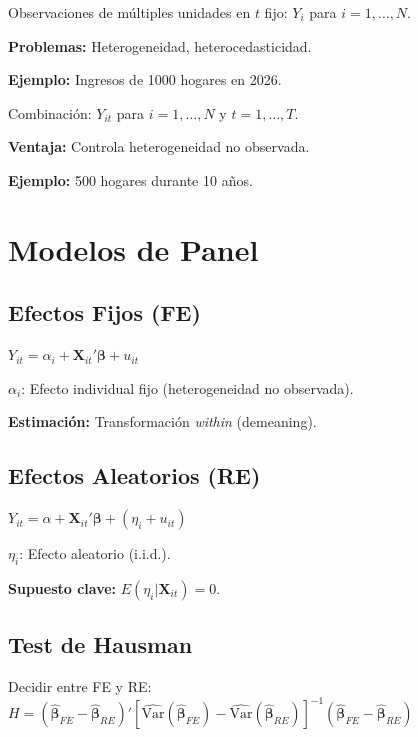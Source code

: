 \documentclass[9pt, spanish, twoside]{article}
\newcommand{\techfont}{\fontfamily{phv}\selectfont}
\newcommand{\critical}[1]{\textcolor{CriticalRed}{\textbf{#1}}}
\newcommand{\eqbox}[1]{\colorbox{TitaniumGray}{$\displaystyle #1$}}
\begin{document}
\begin{multicols*}{3}
\begin{tcolorbox}[colback=TitaniumGray, colframe=NASAClassic, arc=0pt, boxrule=0.3pt, title=\techfont \tiny CORTE TRANSVERSAL, fonttitle=\tiny\bfseries]
\scriptsize
Observaciones de múltiples unidades en $t$ fijo: $Y_i$ para $i=1,\ldots,N$.

\critical{Problemas:} Heterogeneidad, heterocedasticidad.

\textbf{Ejemplo:} Ingresos de 1000 hogares en 2026.
\end{tcolorbox}

\begin{tcolorbox}[colback=TitaniumGray, colframe=NASAClassic, arc=0pt, boxrule=0.3pt, title=\techfont \tiny DATOS DE PANEL, fonttitle=\tiny\bfseries]
\scriptsize
Combinación: $Y_{it}$ para $i=1,\ldots,N$ y $t=1,\ldots,T$.

\critical{Ventaja:} Controla heterogeneidad no observada.

\textbf{Ejemplo:} 500 hogares durante 10 años.
\end{tcolorbox}



\section{Modelos de Panel}
\subsection{Efectos Fijos (FE)}
\eqbox{Y_{it} = \alpha_i + \mathbf{X}_{it}'\boldsymbol{\beta} + u_{it}}

$\alpha_i$: Efecto individual fijo (heterogeneidad no observada).

\textbf{Estimación:} Transformación \textit{within} (demeaning).

\subsection{Efectos Aleatorios (RE)}
\eqbox{Y_{it} = \alpha + \mathbf{X}_{it}'\boldsymbol{\beta} + (\eta_i + u_{it})}

$\eta_i$: Efecto aleatorio (i.i.d.).

\textbf{Supuesto clave:} $E(\eta_i|\mathbf{X}_{it}) = 0$.

\subsection{Test de Hausman}
Decidir entre FE y RE:
$H = (\hat{\boldsymbol{\beta}}_{FE} - \hat{\boldsymbol{\beta}}_{RE})'\left[\widehat{\text{Var}}(\hat{\boldsymbol{\beta}}_{FE}) - \widehat{\text{Var}}(\hat{\boldsymbol{\beta}}_{RE})\right]^{-1}(\hat{\boldsymbol{\beta}}_{FE} - \hat{\boldsymbol{\beta}}_{RE})$


\end{multicols*}
\end{document}
